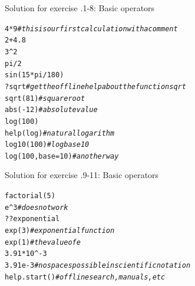 \documentclass[xcolor=table,       handout,    xcolor=dvipsnames]{beamer}\usepackage[]{graphicx}\usepackage[]{color}
\makeatletter
\newcommand{\hlnum}[1]{\textcolor[rgb]{0,0,0}{#1}}
\newcommand{\hlcom}[1]{\textcolor[rgb]{0,0.392,0}{\textit{#1}}}
\newcommand{\hlopt}[1]{\textcolor[rgb]{0,0,0}{#1}}
\newcommand{\hlstd}[1]{\textcolor[rgb]{0,0,0}{#1}}
\newcommand{\hlkwc}[1]{\textcolor[rgb]{1,0,1}{#1}}
\newcommand{\hlkwd}[1]{\textcolor[rgb]{0,0,1}{#1}}
\newenvironment{kframe}{%
 \def\at@end@of@kframe{}%
 \ifinner\ifhmode%
  \def\at@end@of@kframe{\end{minipage}}%
  \begin{minipage}{\columnwidth}%
 \fi\fi%
 \def\FrameCommand##1{\hskip\@totalleftmargin \hskip-\fboxsep
 \colorbox{shadecolor}{##1}\hskip-\fboxsep
     \hskip-\linewidth \hskip-\@totalleftmargin \hskip\columnwidth}%
 \MakeFramed {\advance\hsize-\width
   \@totalleftmargin\z@ \linewidth\hsize
   \@setminipage}}%
 {\par\unskip\endMakeFramed%
 \at@end@of@kframe}
\newenvironment{knitrout}{}{} %
\newcounter{exercisecount}
\makeatother
\begin{document}

\begin{frame}[fragile]{Solution for exercise .1-8: Basic operators}
\begin{knitrout}
\color{fgcolor}\begin{kframe}
\begin{alltt}
\hlnum{4}\hlopt{*}\hlnum{9} \hlcom{# this is our first calculation with a comment}
\hlnum{2} \hlopt{+} \hlnum{4.8}
\hlnum{3}\hlopt{^}\hlnum{2}
\hlstd{pi}\hlopt{/}\hlnum{2}
\hlkwd{sin}\hlstd{(}\hlnum{15}\hlopt{*}\hlstd{pi}\hlopt{/}\hlnum{180}\hlstd{)}
\hlopt{?}\hlstd{sqrt} \hlcom{# get the offline help about the function sqrt}
\hlkwd{sqrt}\hlstd{(}\hlnum{81}\hlstd{)} \hlcom{# square root}
\hlkwd{abs}\hlstd{(}\hlopt{-}\hlnum{12}\hlstd{)} \hlcom{# absolute value}
\hlkwd{log}\hlstd{(}\hlnum{100}\hlstd{)}
\hlkwd{help}\hlstd{(log)} \hlcom{# natural logarithm}
\hlkwd{log10}\hlstd{(}\hlnum{100}\hlstd{)} \hlcom{# log base 10}
\hlkwd{log}\hlstd{(}\hlnum{100}\hlstd{,} \hlkwc{base}\hlstd{=}\hlnum{10}\hlstd{)} \hlcom{# another way}
\end{alltt}
\end{kframe}
\end{knitrout}
\end{frame}


\begin{frame}[fragile]{Solution for exercise .9-11: Basic operators}
\begin{knitrout}
\color{fgcolor}\begin{kframe}
\begin{alltt}
\hlkwd{factorial}\hlstd{(}\hlnum{5}\hlstd{)}
\hlstd{e}\hlopt{^}\hlnum{3} \hlcom{# does not work}
\hlopt{??}\hlstd{exponential}
\hlkwd{exp}\hlstd{(}\hlnum{3}\hlstd{)} \hlcom{# exponential function}
\hlkwd{exp}\hlstd{(}\hlnum{1}\hlstd{)} \hlcom{# the value of e}
\hlnum{3.91} \hlopt{*} \hlnum{10}\hlopt{^-}\hlnum{3}
\hlnum{3.91e-3} \hlcom{# no spaces possible in scientific notation}
\hlkwd{help.start}\hlstd{()} \hlcom{# offline search, manuals, etc}
\end{alltt}
\end{kframe}
\end{knitrout}
\end{frame}
\end{document}
